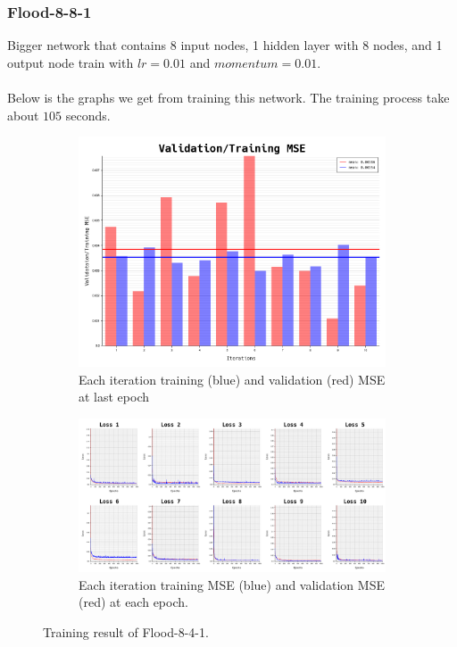 \documentclass{article}
\begin{document}
\newpage
\subsubsection*{Flood-8-8-1}
Bigger network that contains 8 input nodes, 1 hidden layer with 8 nodes, and 1 output node train with $lr = 0.01$ and $momentum = 0.01$.
\\ \\
Below is the graphs we get from training this network. The training process take about $105$ seconds.
\begin{figure}[ht]
	\begin{subfigure}{\textwidth}
		\centering
		\includegraphics[scale=0.3]{flood-8-8-1/cv_l}
		\caption{Each iteration training (blue) and validation (red) MSE at last epoch}
	\end{subfigure}
	\begin{subfigure}{\textwidth}
		\includegraphics[width=\textwidth]{flood-8-8-1/loss}
		\caption{Each iteration training MSE (blue) and validation MSE (red) at each epoch.}
	\end{subfigure}
	\caption{Training result of Flood-8-4-1.}
	\label{fig:5}
\end{figure}
\FloatBarrier
\end{document}
